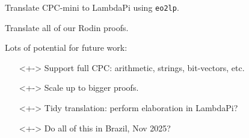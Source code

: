 \documentclass[lualatex, compress, 12pt, handout]{beamer}
\begin{document}
\begin{frame}
	Translate CPC-mini to LambdaPi using \texttt{eo2lp}.
\end{frame}

\begin{frame}
	Translate all of our Rodin proofs.
\end{frame}

\begin{frame}
	Lots of potential for \alert{future work}:
	\begin{itemize}
		\item[\emoji{globe-showing-europe-africa}]<+-> Support full CPC: arithmetic, strings, bit-vectors, etc.
		\item[\emoji{chart-increasing}]<+-> Scale up to bigger proofs.
		\item[\emoji{broom}]<+-> Tidy translation: perform elaboration in LambdaPi?
		\item[\emoji{flag-brazil}]<+-> Do all of this in Brazil, Nov 2025?
	\end{itemize}
\end{frame}








\end{document}
